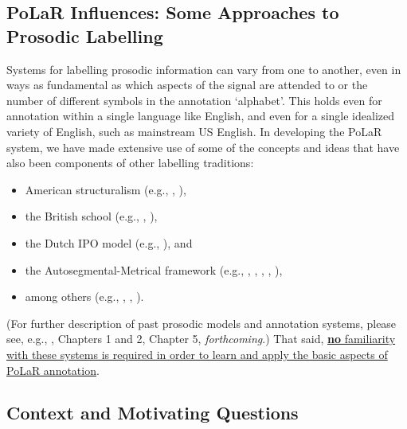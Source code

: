\documentclass[11pt, twoside]{memoir}
\begin{document}
\subsection{PoLaR Influences: Some Approaches to Prosodic Labelling}\label{sec:past-approaches-to-prosodic-labelling}

Systems for labelling prosodic information can vary from one to another, even in ways as fundamental as which aspects of the signal are attended to or the number of different symbols in the annotation ‘alphabet’. This holds even for annotation within a single language like English, and even for a single idealized variety of English, such as mainstream US English. In developing the PoLaR system, we have made extensive use of some of the concepts and ideas that have also been components of other labelling traditions:

\begin{itemize}
\item American structuralism (e.g., \citealt{pike45}, \citealt{tragersmith51}),
\item the British school (e.g., \citealt{crystal69}, \citealt{oconnorarnold73}),
\item the Dutch IPO model (e.g., \citealt{t-hart-90}), and
\item the Autosegmental-Metrical framework (e.g., \citealt{pierrehumbert80}, \citealt{beckmanayers97}, \citealt{grabe-01}, \citealt{hualdeprieto16}, \citealt{dilleybreen18}),
\item among others (e.g., \citealt{hirst07}, \citealt{taylor98}, \citealt{xu12}).
\end{itemize}

(For further description of past prosodic models and annotation systems, please see, e.g., \citealt{roach94}, \citealt{ladd08} Chapters 1 and 2, \citealt{fery17} Chapter 5, \citeauthor{barnesshattuckhufnagel20} \textit{forthcoming}.) That said, \uline{\textbf{no} familiarity with these systems is required in order to learn and apply the basic aspects of PoLaR annotation}.

\subsection{Context and Motivating Questions}\label{sec:context-and-motivating-questions}
\end{document}
